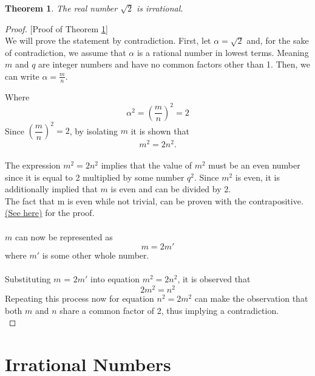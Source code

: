 \documentclass[12pt]{article}
\theoremstyle{plain}
\newtheorem{thm}{Theorem}
\theoremstyle{definition}
\begin{document}
    \begin{thm}\label{thm:main}
        The real number $\sqrt{2}$ is irrational.
    \end{thm}
    
    \begin{proof}{
    [{Proof of Theorem \ref{thm:main}}]\\ 
    
    We will prove the statement by contradiction. First, let $\alpha=\sqrt{2}$ and, for the sake of contradiction, we assume that $\alpha$ is a rational number in lowest terms. Meaning $m$ and $q$
    are integer numbers and have no common factors other than 1.
    Then, we can write $\alpha=\frac{m}{n}$.

    Where
    $$
        \alpha^2 = \left(\dfrac{m}{n}\right)^2 = 2
    $$
    Since $\left(\dfrac{m}{n}\right)^2 = 2$, by isolating $m$ it is shown that \\
    $$
    m^2 = 2n^2.
    $$\\
    The expression $m^2 = 2n^2$ implies that the value of $m^2$ must be an even number since it is equal to 2 multiplied by some number $q^2$. Since $m^2$ is even, it is additionally implied that $m$ is even and can be divided by 2.\\
    The fact that m is even while not trivial, can be proven with the contrapositive. \href{https://www.chilimath.com/lessons/basic-math-proofs/if-n-squared-is-even-then-n-is-even/}{(See  here)} for the proof.\cite{Chili Math}\\\\
    $m$ can now be represented as
    $$m = 2m'$$
    where $m'$ is some other whole number.\\ \\
    Substituting $m$ = $2m'$ into equation $m^2 = 2n^2$, it is observed that
    $$2m^2 = n^2$$
    Repeating this process now for equation $n^2 = 2m^2$ can make the observation that both $m$ and $n$ share a common factor of 2, thus implying a contradiction.\\
}
    \end{proof}

    \section{Irrational Numbers} \label{sect:irrational}
    
\end{document}

